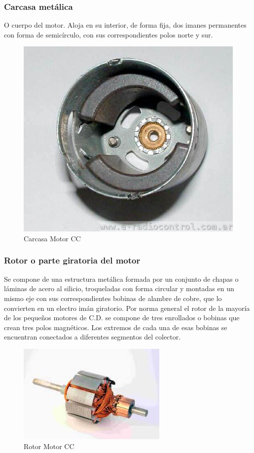 \documentclass[12pt,a4paper]{article}
\begin{document}
\subsubsection*{Carcasa metálica}
O cuerpo del motor. Aloja en su interior, de forma fija, dos imanes permanentes con forma de semicírculo, con sus correspondientes polos norte y sur.
\begin{figure}[hbtp]
\centering
\includegraphics[scale=0.3]{Circuitos/carcasa.jpg}
\caption{Carcasa Motor CC}
\end{figure}

\subsubsection*{Rotor o parte giratoria del motor}
Se compone de una estructura metálica formada por un conjunto de chapas o láminas de acero al silicio, troqueladas con forma circular y montadas en un mismo eje con sus correspondientes bobinas de alambre de cobre, que lo convierten en un electro imán giratorio. Por norma general el rotor de la mayoría de los pequeños motores de C.D. se compone de tres enrollados o bobinas que crean tres polos magnéticos. Los extremos de cada una de esas bobinas se encuentran conectados a diferentes segmentos del colector.
\begin{figure}[hbtp]
\centering
\includegraphics[scale=0.6]{Circuitos/rotor.jpg}
\caption{Rotor Motor CC}
\end{figure}
\end{document}
